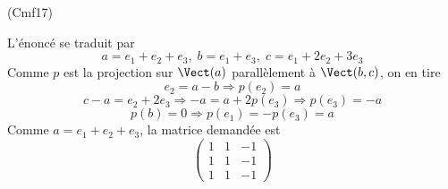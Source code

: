 \begin{tiny}(Cmf17)\end{tiny} L'énoncé se traduit par
\begin{displaymath}
 a = e_1 + e_2 + e_3,\; b = e_1 + e_3,\; c = e_1+2e_2+3e_3
\end{displaymath}
 Comme $p$ est la projection sur $\Vect(a)$ parallèlement à $\Vect(b,c)$, on en tire
\begin{displaymath}
 e_2 = a-b \Rightarrow p(e_2)= a
\end{displaymath}
\begin{displaymath}
 c-a = e_2 +2e_3 \Rightarrow -a= a + 2p(e_3)\Rightarrow p(e_3)=-a
\end{displaymath}
\begin{displaymath}
 p(b)=0 \Rightarrow p(e_1)=-p(e_3)=a 
\end{displaymath}
Comme $a=e_1+e_2+e_3$, la matrice demandée est
\begin{displaymath}
 \begin{pmatrix}
  1 & 1 & -1 \\1 & 1 & -1 \\ 1 & 1 & -1
 \end{pmatrix}
\end{displaymath}
 